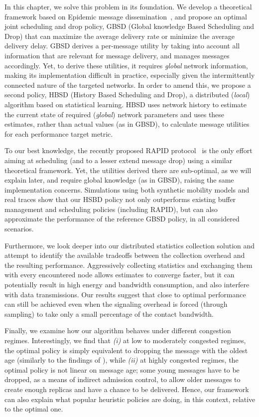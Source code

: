 In this chapter, we solve this problem in its foundation. We develop a theoretical framework based on Epidemic message dissemination~\cite{haas:mobihoc03,Inria:MessageDelay,akis:mobihoc06}, and propose an optimal joint scheduling and drop policy, GBSD (Global knowledge Based Scheduling and Drop) that can maximize the average delivery rate or minimize the average delivery delay. GBSD derives a per-message utility by taking into account all information that are relevant for message delivery, and manages messages accordingly. Yet, to derive these utilities, it requires \textit{global} network information, making its implementation difficult in practice, especially given the intermittently connected nature of the targeted networks. In order to amend this, we propose a second policy, HBSD (History Based Scheduling and Drop), a distributed (\textit{local}) algorithm based on statistical learning. HBSD uses network history to estimate the current state of required (\textit{global}) network parameters and uses these estimates, rather than actual values (as in GBSD), to calculate message utilities for each performance target metric.

To our best knowledge, the recently proposed RAPID protocol~\cite{Levine:Sigcomm07} is the only effort aiming at scheduling (and to a lesser extend message drop) using a similar theoretical framework. Yet, the utilities derived there are sub-optimal, as we will explain later, and require global knowledge (as in GBSD), raising the same implementation concerns. Simulations using both synthetic mobility models and real traces show that our HSBD policy not only outperforms existing buffer management and scheduling policies (including RAPID), but can also approximate the performance of the reference GBSD policy, in all considered scenarios.

Furthermore, we look deeper into our distributed statistics collection solution and attempt to identify the available tradeoffs between the collection overhead and the resulting performance. Aggressively collecting statistics and exchanging them with every encountered node allows estimates to converge faster, but it can potentially result in high energy and bandwidth consumption, and also interfere with data transmissions. Our results suggest that close to optimal performance can still be achieved even when the signaling overhead is forced (through sampling) to take only a small percentage of the contact bandwidth.

Finally, we examine how our algorithm behaves under different congestion regimes. Interestingly, we find that \emph{(i)} at low to moderately congested regimes, the optimal policy is simply equivalent to dropping the message with the oldest age (similarly to the findings of \cite{QueuingPolicies}), while \emph{(ii)} at highly congested regimes, the optimal policy is not linear on message age; some young messages have to be dropped, as a means of indirect admission control, to allow older messages to create enough replicas and have a chance to be delivered. Hence, our framework can also explain what popular heuristic policies are doing, in this context, relative to the optimal one.

